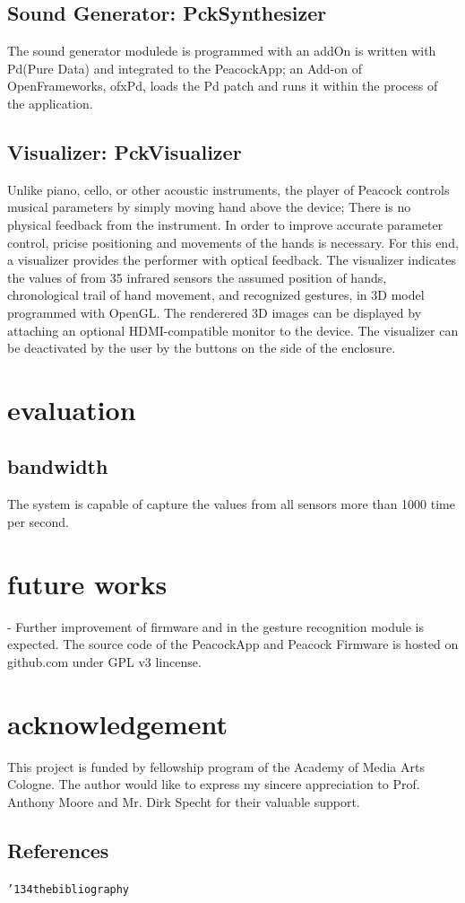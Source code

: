 \documentclass{nime-alternate}
\begin{document}
\subsection{Sound Generator: PckSynthesizer}

The sound generator modulede is programmed with an addOn 
 is written with Pd(Pure Data) and integrated to the PeacockApp; an Add-on of OpenFrameworks, ofxPd, loads the Pd patch and runs it within the process of the application.

\subsection{Visualizer: PckVisualizer}

Unlike piano, cello, or other acoustic instruments, the player of Peacock controls musical parameters by simply moving hand above the device; There is no physical feedback from the instrument. In order to improve accurate parameter control, pricise positioning and movements of the hands is necessary. For this end, a visualizer provides the performer with optical feedback.  The visualizer indicates the values of from 35 infrared sensors  the assumed position of hands, chronological trail of hand movement, and recognized gestures, in  3D model programmed with OpenGL. The renderered 3D images can be displayed by attaching an optional HDMI-compatible monitor to the device.
The visualizer can be deactivated by the user by the buttons on the side of the enclosure.


\section{evaluation}

\subsection{bandwidth}
The system is capable of capture the values from all sensors more than 1000 time per second.



\section{future works}

- Further improvement of firmware and in the gesture recognition module is expected.
The source code of the PeacockApp and Peacock Firmware is hosted on github.com under GPL v3 lincense.


\section{acknowledgement}
This project is funded by fellowship program of the Academy of Media Arts Cologne. The author would like to express my sincere appreciation to Prof. Anthony Moore and Mr. Dirk Specht for their valuable support.



\subsection{References}
\texttt{{\char'134}thebibliography}
\end{document}
